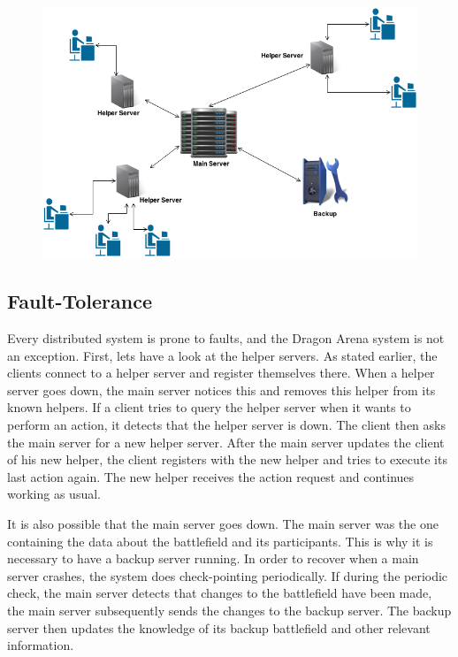 \begin{figure}[ht]
\includegraphics[scale=0.5]{images/DCS.png}
\end{figure}

\subsection{Fault-Tolerance}
Every distributed system is prone to faults, and the Dragon Arena system is not an exception. 
First, lets have a look at the helper servers. As stated earlier, the clients connect to a helper server and register themselves there.
When a helper server goes down, the main server notices this and removes this helper from its known helpers.
If a client tries to query the helper server when it wants to perform an action, it detects that the helper server is down.
The client then asks the main server for a new helper server.
After the main server updates the client of his new helper, the client registers with the new helper and tries to execute its last action again.
The new helper receives the action request and continues working as usual.

It is also possible that the main server goes down. 
The main server was the one containing the data about the battlefield and its participants.
This is why it is necessary to have a backup server running.  
In order to recover when a main server crashes, the system does check-pointing periodically.
If during the periodic check, the main server detects that changes to the battlefield have been made, the main server subsequently sends the changes to the backup server.
The backup server then updates the knowledge of its backup battlefield and other relevant information.

